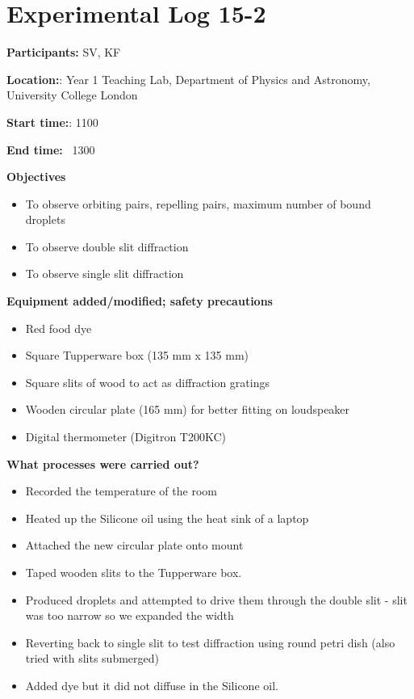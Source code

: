 
\section{Experimental Log 15-2}

\textbf{Participants:} SV, KF

\textbf{Location:}: Year 1 Teaching Lab, Department of Physics and Astronomy, University College London

\textbf{Start time:}: 1100

\textbf{End time:} \ 1300


\bigskip

\textbf{Objectives}

\begin{itemize}
\item To observe orbiting pairs, repelling pairs, maximum number of bound droplets
\item To observe double slit diffraction
\item To observe single slit diffraction
\end{itemize}
\bigskip

\textbf{Equipment added/modified; safety precautions}

\begin{itemize}
\item Red food dye
\item Square Tupperware box (135 mm x 135 mm)
\item Square slits of wood to act as diffraction gratings
\item Wooden circular plate (165 mm) for better fitting on loudspeaker
\item Digital thermometer (Digitron T200KC)
\end{itemize}
\bigskip

\textbf{What processes were carried out?}

\begin{itemize}
\item Recorded the temperature of the room
\item Heated up the Silicone oil using the heat sink of a laptop
\item Attached the new circular plate onto mount
\item Taped wooden slits to the Tupperware box.
\item Produced droplets and attempted to drive them through the double slit - slit was too narrow so we expanded the width
\item Reverting back to single slit to test diffraction using round petri dish (also tried with slits submerged)
\item Added dye but it did not diffuse in the Silicone oil.
\end{itemize}
\bigskip

